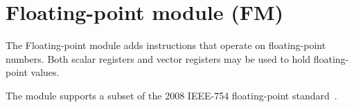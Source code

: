 %

\chapter{Floating-point module (FM)}
\label{module:FM}

The Floating-point module adds instructions that operate on floating-point
numbers. Both scalar registers and vector registers may be used to hold
floating-point values.

The module supports a subset of the 2008 IEEE-754 floating-point
standard~\cite{ieee754-2008}.

\tbd
